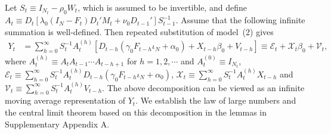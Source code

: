 \documentclass[11pt,a4paper]{article}
\begin{document}
Let \(S_t\equiv I_{N_t}-\rho_0W_t\), which is assumed to be invertible, and define
\(A_t\equiv D_t[\lambda_0(I_N-F_t)D_t'M_t+\nu_0D_{t-1}']S_{t-1}^{-1}\).
Assume that the following infinite summation is well-defined. Then repeated substitution of model~(2) gives
\begin{align}
Y_t&=\sum_{h=0}^{\infty}S_{t}^{-1}A_t^{(h)}[D_{t-h} (\gamma_0F_{t-h}\iota_N+\alpha_0)+X_{t-h}\beta_0+V_{t-h}]\equiv\mathcal{E}_t+\mathcal{X}_t\beta_0+\mathcal{V}_t,\label{model_sumV}
\end{align}
where $A_t^{(h)}\equiv A_{t}A_{t-1}\cdots A_{t-h+1}$ for $h=1,2,\cdots$ and $A_t^{(0)}\equiv I_{N_t}$, $\mathcal{E}_t\equiv \sum_{h=0}^{\infty}S_{t}^{-1}A_t^{(h)}D_{t-h}(\gamma_0F_{t-h}\iota_N+\alpha_0)$, 
$\mathcal{X}_t\equiv \sum_{h=0}^{\infty}S_{t}^{-1}A_t^{(h)}X_{t-h}$ and $\mathcal{V}_t\equiv \sum_{h=0}^{\infty}S_{t}^{-1}A_t^{(h)}V_{t-h}$. 
The above decomposition can be viewed as an infinite moving average representation of $Y_t$. 
We establish the law of large numbers and the central limit theorem based on this decomposition in the lemmas in Supplementary Appendix A.




\end{document}
